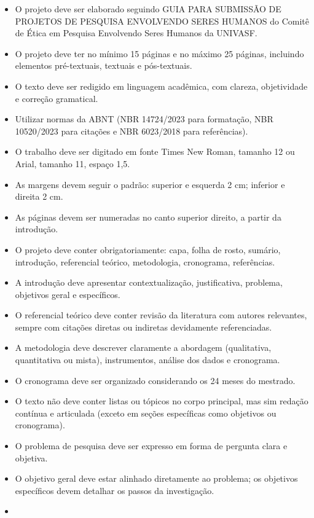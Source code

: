 \documentclass[
  brazilian,
  12pt,
  letterpaper,
  DIV=11,
  numbers=noendperiod]{scrartcl}
\begin{document}
\begin{itemize}
\item
  O projeto deve ser elaborado seguindo GUIA PARA SUBMISSÃO DE PROJETOS
  DE PESQUISA ENVOLVENDO SERES HUMANOS do Comitê de Ética em Pesquisa
  Envolvendo Seres Humanos da UNIVASF.
\item
  O projeto deve ter no mínimo 15 páginas e no máximo 25 páginas,
  incluindo elementos pré-textuais, textuais e pós-textuais.
\item
  O texto deve ser redigido em linguagem acadêmica, com clareza,
  objetividade e correção gramatical.
\item
  Utilizar normas da ABNT (NBR 14724/2023 para formatação, NBR
  10520/2023 para citações e NBR 6023/2018 para referências).
\item
  O trabalho deve ser digitado em fonte Times New Roman, tamanho 12 ou
  Arial, tamanho 11, espaço 1,5.
\item
  As margens devem seguir o padrão: superior e esquerda 2 cm; inferior e
  direita 2 cm.
\item
  As páginas devem ser numeradas no canto superior direito, a partir da
  introdução.
\item
  O projeto deve conter obrigatoriamente: capa, folha de rosto, sumário,
  introdução, referencial teórico, metodologia, cronograma, referências.
\item
  A introdução deve apresentar contextualização, justificativa,
  problema, objetivos geral e específicos.
\item
  O referencial teórico deve conter revisão da literatura com autores
  relevantes, sempre com citações diretas ou indiretas devidamente
  referenciadas.
\item
  A metodologia deve descrever claramente a abordagem (qualitativa,
  quantitativa ou mista), instrumentos, análise dos dados e cronograma.
\item
  O cronograma deve ser organizado considerando os 24 meses do mestrado.
\item
  O texto não deve conter listas ou tópicos no corpo principal, mas sim
  redação contínua e articulada (exceto em seções específicas como
  objetivos ou cronograma).
\item
  O problema de pesquisa deve ser expresso em forma de pergunta clara e
  objetiva.
\item
  O objetivo geral deve estar alinhado diretamente ao problema; os
  objetivos específicos devem detalhar os passos da investigação.
\item

\end{itemize}
\end{document}
